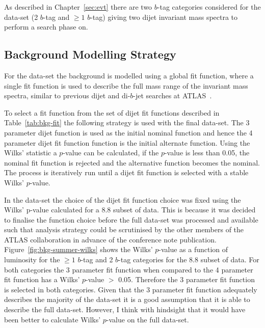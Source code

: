 As described in Chapter~\ref{sec:evt}
there are two $b$-tag categories considered for the \summer{} data-set 
(2 $b$-tag and $\geq1$ $b$-tag)
giving two dijet invariant mass spectra to perform a search phase on.

\subsection{Background Modelling Strategy}
\label{sec:bkg-summer_global}

For the \summer{} data-set the background is modelled using a global fit function,
where a single fit function is used to describe the full mass range of the invariant mass spectra,
similar to previous dijet and di-$b$-jet searches at ATLAS~\cite{dijet-mori16_paper,dibjet-mori16_paper}.

To select a fit function from the set of dijet fit functions described in Table~\ref{tab:bkg-fit} the following strategy is used with the final data-set.
The 3 parameter dijet function is used as the initial nominal function and hence the 4 parameter dijet fit function function is the initial alternate function.
Using the Wilks' statistic a $p$-value can be calculated,
if the $p$-value is less than 0.05, the nominal fit function is rejected and the alternative function becomes the nominal.
The process is iteratively run until a dijet fit function is selected with a stable Wilks' $p$-value.

In the \summer{} data-set the choice of the dijet fit function choice was fixed using the Wilks' p-value calculated for a 8.8 \ifb{} subset of data.
This is because it was decided to finalise the function choice before the full data-set was processed and available
such that analysis strategy could be scrutinised by the other members of the ATLAS collaboration in advance of the conference note publication.
Figure~\ref{fig:bkg-summer-wilks} shows the Wilks' $p$-value as a function of luminosity
for the $\geq1$ $b$-tag and 2 $b$-tag categories for the 8.8 \ifb{} subset of data.
For both categories the 3 parameter fit function when compared to the 4 parameter fit function
has a Wilks' $p$-value $>$ 0.05.
Therefore the 3 parameter fit function is selected in both categories.
Given that the 3 parameter fit function adequately describes the majority of the data-set it is a good assumption that it is able to describe the full data-set.
However, I think with hindsight that it would have been better to calculate Wilks' $p$-value on the full data-set.


